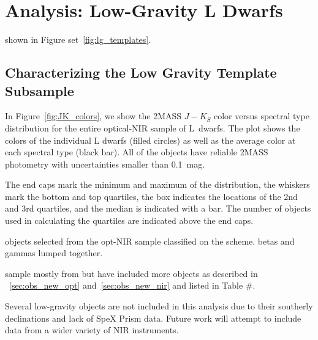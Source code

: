 \documentclass[12pt,preprint]{aastex}
\begin{document}

\clearpage
\section{Analysis: Low-Gravity L Dwarfs}
\label{sec:lowg}

shown in Figure set~\ref{fig:lg_templates}.



\subsection{Characterizing the Low Gravity Template Subsample}
\label{sec:templates_lowg}

In Figure~\ref{fig:JK_colors}, we show the 2MASS $J-K_S$ color versus spectral type distribution for the entire optical-NIR sample of L~dwarfs. The plot shows the colors of the individual L dwarfs (filled circles) as well as the average color at each spectral type (black bar). All of the objects have reliable 2MASS photometry with uncertainties smaller than 0.1~mag. 

The end caps mark the minimum and maximum of the distribution, the whiskers mark the bottom and top quartiles, the box indicates the locations of the 2nd and 3rd quartiles, and the median is indicated with a bar. The number of objects used in calculating the quartiles are indicated above the end caps.

objects selected from the opt-NIR sample classified on the \citet{Cruz09_lowg} scheme. betas and gammas lumped together.

sample mostly from \citet{Cruz09_lowg} but have included more objects as described in \SS~\ref{sec:obs_new_opt} and~\ref{sec:obs_new_nir} and listed in Table \#.

Several low-gravity objects are not included in this analysis due to their southerly declinations and lack of SpeX Prism data. Future work will attempt to include data from a wider variety of NIR instruments.
\end{document}
